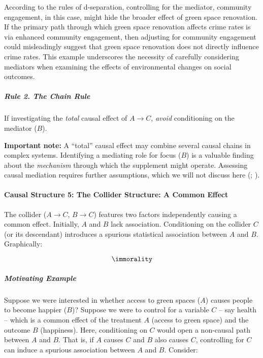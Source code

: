 \documentclass[
  singlecolumn]{article}
\let\oldparagraph\paragraph
\renewcommand{\paragraph}[1]{\oldparagraph{#1}\mbox{}}
\let\oldsubparagraph\subparagraph
\renewcommand{\subparagraph}[1]{\oldsubparagraph{#1}\mbox{}}
\begin{document}
According to the rules of d-separation, controlling for the mediator,
community engagement, in this case, might hide the broader effect of
green space renovation. If the primary path through which green space
renovation affects crime rates is via enhanced community engagement,
then adjusting for community engagement could misleadingly suggest that
green space renovation does not directly influence crime rates. This
example underscores the necessity of carefully considering mediators
when examining the effects of environmental changes on social outcomes.

\subparagraph{Rule 2. The Chain Rule}\label{rule-2.-the-chain-rule}

If investigating the \emph{total} causal effect of \(A\to C\),
\emph{avoid} conditioning on the mediator (\(B\)).

\textbf{Important note:} A ``total'' causal effect may combine several
causal chains in complex systems. Identifying a mediating role for focus
(\(B\)) is a valuable finding about the \emph{mechanism} through which
the supplement might operate. Assessing causal mediation requires
further assumptions, which we will not discuss here
(;
).

\paragraph{Causal Structure 5: The Collider Structure: A Common
Effect}\label{causal-structure-5-the-collider-structure-a-common-effect}

The collider (\(A\to C\), \(B \to C\)) features two factors
independently causing a common effect. Initially, \(A\) and \(B\) lack
association. Conditioning on the collider \(C\) (or its descendant)
introduces a spurious statistical association between \(A\) and \(B\).
Graphically:

\[\immorality\]

\subparagraph{Motivating Example}\label{motivating-example-2}

Suppose we were interested in whether access to green spaces (\(A\))
causes people to become happier (\(B\))? Suppose we were to control for
a variable \(C\) -- say health -- which is a common effect of the
treatment \(A\) (access to green space) and the outcome \(B\)
(happiness). Here, conditioning on \(C\) would open a non-causal path
between \(A\) and \(B\). That is, if \(A\) causes \(C\) and \(B\) also
causes \(C\), controlling for \(C\) can induce a spurious association
between \(A\) and \(B\). Consider:
\end{document}
